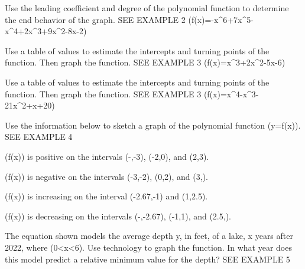 \documentclass{article}
\newenvironment{practice}[2]{}{}        %
\newcommand{\answer}[1]{}               %
\newcommand{\placeholder}[2]{}          %
\begin{document}
\begin{practice}{23}{1}
Use the leading coefficient and degree of the polynomial function to determine the end behavior of the graph. SEE EXAMPLE 2
(f(x)=-x^6+7x^5-x^4+2x^3+9x^2-8x-2)
\answer{See back of book.}
\end{practice}
\begin{practice}{24}{1}
Use a table of values to estimate the intercepts and turning points of the function. Then graph the function. SEE EXAMPLE 3
(f(x)=x^3+2x^2-5x-6)
\answer{See back of book.}
\end{practice}
\begin{practice}{25}{1}
Use a table of values to estimate the intercepts and turning points of the function. Then graph the function. SEE EXAMPLE 3
(f(x)=x^4-x^3-21x^2+x+20)
\answer{See back of book.}
\end{practice}
\begin{practice}{26}{2}
Use the information below to sketch a graph of the polynomial function (y=f(x)). SEE EXAMPLE 4
\item (f(x)) is positive on the intervals (-\infty,-3), (-2,0), and (2,3).
\item (f(x)) is negative on the intervals (-3,-2), (0,2), and (3,\infty).
\item (f(x)) is increasing on the interval (-2.67,-1) and (1,2.5).
\item (f(x)) is decreasing on the intervals (-\infty,-2.67), (-1,1), and (2.5,\infty).
\answer{See back of book.}
\end{practice}
\begin{practice}{27}{2}
The equation shown models the average depth y, in feet, of a lake, x years after 2022, where (0<x<6). Use technology to graph the function. In what year does this model predict a relative minimum value for the depth? SEE EXAMPLE 5
\placeholder{illustration}{Cross-section of a lake with mountains behind it and a cliff at the left; turquoise water over a brown lake bottom. Upper dashed horizontal line labeled 2022, x=0; lower dashed line labeled Lake Bottom. White label in water: depth: (y=x^4-9x^3+24x^2-31x+66).}
\answer{See back of book.}
\end{practice}
\end{document}
